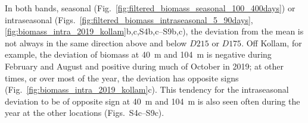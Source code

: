 \documentclass[authoryear,review,11pt]{elsarticle}
\begin{document}
In both bands, seasonal (Fig.~\ref{fig:filtered_biomass_seasonal_100_400days}) or intraseasonal (Figs.~\ref{fig:filtered_biomass_intraseasonal_5_90days},\ref{fig:biomass_intra_2019_kollam}b,c,S4b,c--S9b,c), the deviation from the mean is not always in the same direction above and below $D215$ or $D175$. Off Kollam, for example, the deviation of biomass at 40~m and 104~m is negative during February and August and positive during much of October in 2019; at other times, or over most of the year, the deviation has opposite signs (Fig.~\ref{fig:biomass_intra_2019_kollam}c). This tendency for the intraseasonal deviation to be of opposite sign at 40~m and 104~m is also seen often during the year at the other locations (Figs.~S4c--S9c).


\end{document}
